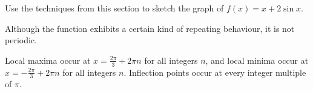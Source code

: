 \begin{question}\label{s3.6.6trig1}
Use the techniques from this section to sketch the graph of $f(x)=x+2\sin x$.
\end{question}
\begin{hint}
Although the function exhibits a certain kind of repeating behaviour, it is not periodic.
\end{hint}
\begin{answer}
Local maxima occur at $x=\frac{2\pi}{3}+2\pi n$ for all integers $n$, and local minima occur at $x=-\frac{2\pi}{3}+2\pi n$ for all integers $n$. Inflection points occur at
every integer multiple of $\pi$.
\begin{center}
\end{center}
\end{answer}
